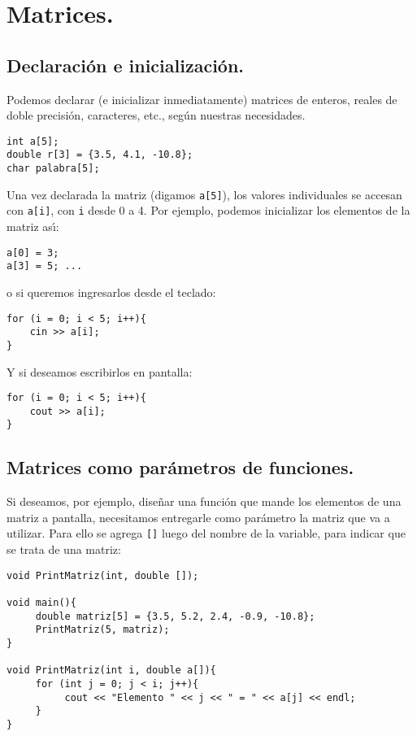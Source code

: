 \section{Matrices.}

\subsection{Declaraci{\'o}n e inicializaci{\'o}n.}

Podemos declarar (e inicializar inmediatamente) matrices de enteros,
reales de doble precisi{\'o}n, caracteres, etc., seg{\'u}n nuestras
necesidades.

\begin{verbatim}
int a[5];
double r[3] = {3.5, 4.1, -10.8};
char palabra[5];
\end{verbatim}

Una vez declarada la matriz (digamos \verb+a[5]+), los valores
individuales se accesan con \verb+a[i]+, con 
\verb+i+ desde 0 a 4. Por ejemplo, podemos inicializar los elementos
de la matriz as{\'\i}:
\begin{verbatim}
a[0] = 3;
a[3] = 5; ...
\end{verbatim}
o si queremos ingresarlos desde el teclado:
\begin{verbatim}
for (i = 0; i < 5; i++){
    cin >> a[i];
}
\end{verbatim}
Y si deseamos escribirlos en pantalla:
\begin{verbatim}
for (i = 0; i < 5; i++){
    cout >> a[i];
}
\end{verbatim}

\subsection{Matrices como par{\'a}metros de funciones.}

Si deseamos, por ejemplo, dise{\~n}ar una funci{\'o}n que mande los
elementos de una matriz a pantalla, necesitamos entregarle como
par\'ametro la matriz que va a utilizar. Para ello se agrega 
\verb+[]+ luego del nombre de la variable, para indicar que se trata
de una matriz:

\begin{verbatim}
void PrintMatriz(int, double []);

void main(){
     double matriz[5] = {3.5, 5.2, 2.4, -0.9, -10.8};
     PrintMatriz(5, matriz);
}

void PrintMatriz(int i, double a[]){
     for (int j = 0; j < i; j++){
          cout << "Elemento " << j << " = " << a[j] << endl;
     }
}

\end{verbatim}

